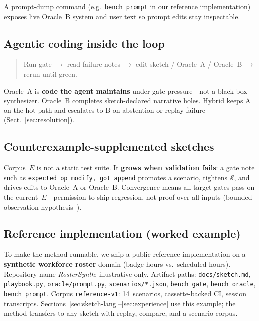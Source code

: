 \documentclass[11pt]{article}
\begin{document}
A prompt-dump command (e.g.\ \texttt{bench prompt} in our reference implementation)
exposes live Oracle~B system and user text so prompt edits stay inspectable.

\subsection{Agentic coding inside the loop}

\begin{quote}
Run gate $\rightarrow$ read failure notes $\rightarrow$ edit sketch / Oracle~A /
Oracle~B $\rightarrow$ rerun until green.
\end{quote}

Oracle~A is \textbf{code the agent maintains} under gate pressure---not a black-box
synthesizer. Oracle~B completes sketch-declared narrative holes. Hybrid keeps A on the
hot path and escalates to B on abstention or replay failure (Sect.~\ref{sec:resolution}).

\subsection{Counterexample-supplemented sketches}

Corpus~$E$ is not a static test suite. It \textbf{grows when validation fails}:
a gate note such as \texttt{expected op modify, got append} promotes a scenario, tightens
$\mathcal{S}$, and drives edits to Oracle~A or Oracle~B. Convergence means all target
gates pass on the current~$E$---permission to ship regression, not proof over all inputs
(bounded observation hypothesis~\cite{solar2013sketching}).

\subsection{Reference implementation (worked example)}

To make the method runnable, we ship a public reference implementation on a \textbf{synthetic
workforce roster} domain (badge hours vs.\ scheduled hours). Repository name
\textit{RosterSynth}; illustrative only. Artifact paths: \texttt{docs/sketch.md},
\texttt{playbook.py}, \texttt{oracle/prompt.py}, \texttt{scenarios/*.json},
\texttt{bench gate}, \texttt{bench oracle}, \texttt{bench prompt}. Corpus
\texttt{reference-v1}: 14~scenarios, cassette-backed CI, session transcripts.
Sections~\ref{sec:sketch-lang}--\ref{sec:experience} use this example; the method
transfers to any sketch with replay, compare, and a scenario corpus.
\end{document}
